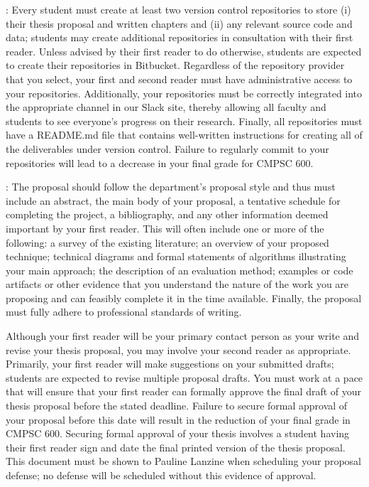 \documentclass[11pt]{article}
\begin{document}
: Every student must create at least two version control repositories to store (i)
their thesis proposal and written chapters and (ii) any relevant source code and data; students may create additional
repositories in consultation with their first reader. Unless advised by their first reader to do otherwise, students are
expected to create their repositories in Bitbucket. Regardless of the repository provider that you select, your first
and second reader must have administrative access to your repositories. Additionally, your repositories must be
correctly integrated into the appropriate channel in our Slack site, thereby allowing all faculty and students to see
everyone's progress on their research. Finally, all repositories must have a README.md file that contains well-written
instructions for creating all of the deliverables under version control. Failure to regularly commit to
your repositories will lead to a decrease in your final grade for CMPSC 600.

: The proposal should follow the department's proposal style and thus must include an
abstract, the main body of your proposal, a tentative schedule for completing the project, a bibliography, and any other
information deemed important by your first reader. This will often include one or more of the following: a survey of the
existing literature; an overview of your proposed technique; technical diagrams and formal statements of algorithms
illustrating your main approach; the description of an evaluation method; examples or code artifacts or other evidence that
you understand the nature of the work you are proposing and can feasibly complete it in the time available.  Finally, the
proposal must fully adhere to professional standards of writing.

Although your first reader will be your primary contact person as your write and revise your thesis proposal, you may
involve your second reader as appropriate. Primarily, your first reader will make suggestions on your submitted drafts;
students are expected to revise multiple proposal drafts.  You must work at a pace that will ensure that your first
reader can formally approve the final draft of your thesis proposal before the stated deadline. Failure to secure formal
approval of your proposal before this date will result in the reduction of your final grade in CMPSC 600.  Securing
formal approval of your thesis involves a student having their first reader sign and date the final printed version of
the thesis proposal. This document must be shown to Pauline Lanzine when scheduling your proposal defense; no defense
will be scheduled without this evidence of approval.
\end{document}
